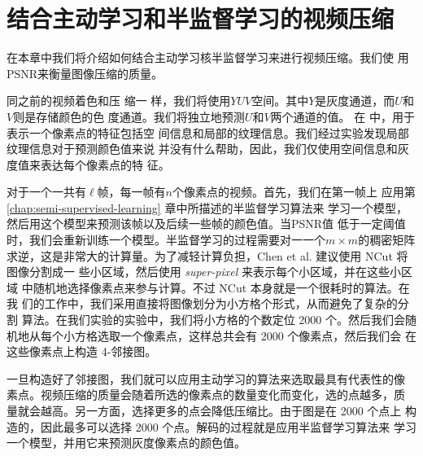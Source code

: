 \chapter{结合主动学习和半监督学习的视频压缩}

在本章中我们将介绍如何结合主动学习核半监督学习来进行视频压缩。我们使
用PSNR来衡量图像压缩的质量。

同之前的视频着色和压
缩\cite{learning-to-compress-images,colorization-using-optimization}一
样，我们将使用$YUV$空间。其中$Y$是灰度通道，而$U$和$V$则是存储颜色的色
度通道。我们将独立地预测$U$和$V$两个通道的值。
在\cite{learning-to-compress-images} 中，用于表示一个像素点的特征包括空
间信息和局部的纹理信息。我们经过实验发现局部纹理信息对于预测颜色值来说
并没有什么帮助，因此，我们仅使用空间信息和灰度值来表达每个像素点的特
征。

对于一个一共有$\ell$帧，每一帧有$n$个像素点的视频。首先，我们在第一帧上
应用第 \ref{chap:semi-supervised-learning} 章中所描述的半监督学习算法来
学习一个模型，然后用这个模型来预测该帧以及后续一些帧的颜色值。当PSNR值
低于一定阈值时，我们会重新训练一个模型。半监督学习的过程需要对一一个$m
\times m$的稠密矩阵求逆，这是非常大的计算量。为了减轻计算负担，Chen et
al. \cite{learning-to-compress-images} 建议使用 NCut
\cite{learning-a-classification-model-for-segmentation} 将图像分割成一
些小区域，然后使用 {\em super-pixel} 来表示每个小区域，并在这些小区域
中随机地选择像素点来参与计算。不过 NCut 本身就是一个很耗时的算法。在我
们的工作中，我们采用直接将图像划分为小方格个形式，从而避免了复杂的分割
算法。在我们实验的实验中，我们将小方格的个数定位 2000 个。然后我们会随
机地从每个小方格选取一个像素点，这样总共会有 2000 个像素点，然后我们会
在这些像素点上构造 4-邻接图。

一旦构造好了邻接图，我们就可以应用主动学习的算法来选取最具有代表性的像
素点。视频压缩的质量会随着所选的像素点的数量变化而变化，选的点越多，质
量就会越高。另一方面，选择更多的点会降低压缩比。由于图是在 2000 个点上
构造的，因此最多可以选择 2000 个点。解码的过程就是应用半监督学习算法来
学习一个模型，并用它来预测灰度像素点的颜色值。

